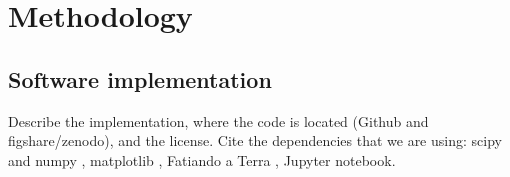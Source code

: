 \section{Methodology}

\lipsum[3]

\subsection{Software implementation}

Describe the implementation, where the code is located (Github and
figshare/zenodo), and the license.
Cite the dependencies that we are using:
scipy and numpy \citep{numpy},
matplotlib \citep{matplotlib},
Fatiando a Terra \citep{fatiando},
Jupyter notebook\citep{jupyter}.
